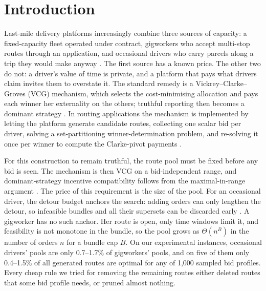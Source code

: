 \documentclass[review,12pt]{elsarticle}
\theoremstyle{definition}
\theoremstyle{remark}
\begin{document}

\section{Introduction}
\label{sec:intro}

Last-mile delivery platforms increasingly combine three sources of
capacity: a fixed-capacity fleet operated under contract, gigworkers who
accept multi-stop routes through an application, and occasional drivers
who carry parcels along a trip they would make anyway
\citep{archetti2016vrpod,luy2024workforce}. The first source has a known
price. The other two do not: a driver's value of time is private, and a
platform that pays what drivers claim invites them to overstate it. The
standard remedy is a Vickrey--Clarke--Groves (VCG) mechanism, which selects
the cost-minimising allocation and pays each winner her externality on the
others; truthful reporting then becomes a dominant strategy
\citep{nisan2007agt}. In routing applications the mechanism is implemented
by letting the platform generate candidate routes, collecting one scalar
bid per driver, solving a set-partitioning winner-determination problem,
and re-solving it once per winner to compute the Clarke-pivot payments
\citep{zou2022mechanisms,li2026auction}.

For this construction to remain truthful, the route pool must be fixed
before any bid is seen. The mechanism is then VCG on a bid-independent
range, and dominant-strategy incentive compatibility follows from the
maximal-in-range argument \citep{nisan2007computationally}. The price of
this requirement is the size of the pool. For an occasional driver, the
detour budget anchors the search: adding orders can only lengthen the
detour, so infeasible bundles and all their supersets can be discarded
early \citep{li2026auction}. A gigworker has no such anchor. Her route is
open, only time windows limit it, and feasibility is not monotone in the
bundle, so the pool grows as $\Theta(n^B)$ in the number of orders $n$ for
a bundle cap $B$. On our experimental instances, occasional drivers' pools
are only 0.7--1.7\% of gigworkers' pools, and on five of them only
0.4--1.5\% of all generated routes are optimal for any of 1,000 sampled bid
profiles. Every cheap rule we tried for removing the remaining routes either
deleted routes that some bid profile needs, or pruned almost nothing.
\end{document}
